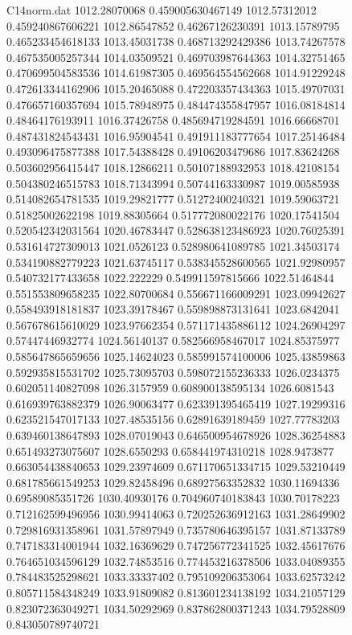 \begin{filecontents}{C14norm.dat}
1012.28070068			0.459005630467149
1012.57312012			0.459240867606221
1012.86547852			0.46267126230391
1013.15789795			0.465233454618133
1013.45031738			0.468713292429386
1013.74267578			0.467535005257344
1014.03509521			0.469703987644363
1014.32751465			0.470699504583536
1014.61987305			0.469564554562668
1014.91229248			0.472613344162906
1015.20465088			0.472203357434363
1015.49707031			0.476657160357694
1015.78948975			0.484474355847957
1016.08184814			0.48464176193911
1016.37426758			0.485694719284591
1016.66668701			0.487431824543431
1016.95904541			0.491911183777654
1017.25146484			0.493096475877388
1017.54388428			0.49106203479686
1017.83624268			0.503602956415447
1018.12866211			0.50107188932953
1018.42108154			0.504380246515783
1018.71343994			0.50744163330987
1019.00585938			0.514082654781535
1019.29821777			0.51272400240321
1019.59063721			0.51825002622198
1019.88305664			0.517772080022176
1020.17541504			0.520542342031564
1020.46783447			0.528638123486923
1020.76025391			0.531614727309013
1021.0526123			0.528980641089785
1021.34503174			0.534190882779223
1021.63745117			0.538345528600565
1021.92980957			0.540732177433658
1022.222229			0.549911597815666
1022.51464844			0.551553809658235
1022.80700684			0.556671166009291
1023.09942627			0.558493918181837
1023.39178467			0.559898873131641
1023.6842041			0.567678615610029
1023.97662354			0.571171435886112
1024.26904297			0.57447446932774
1024.56140137			0.582566958467017
1024.85375977			0.585647865659656
1025.14624023			0.585991574100006
1025.43859863			0.592935815531702
1025.73095703			0.598072155236333
1026.0234375			0.602051140827098
1026.3157959			0.608900138595134
1026.6081543			0.616939763882379
1026.90063477			0.623391395465419
1027.19299316			0.623521547017133
1027.48535156			0.62891639189459
1027.77783203			0.639460138647893
1028.07019043			0.646500954678926
1028.36254883			0.651493273075607
1028.6550293			0.658441974310218
1028.9473877			0.663054438840653
1029.23974609			0.671170651334715
1029.53210449			0.681785661549253
1029.82458496			0.68927563352832
1030.11694336			0.69589085351726
1030.40930176			0.704960740183843
1030.70178223			0.712162599496956
1030.99414063			0.720252636912163
1031.28649902			0.729816931358961
1031.57897949			0.735780646395157
1031.87133789			0.747183314001944
1032.16369629			0.747256772341525
1032.45617676			0.764651034596129
1032.74853516			0.774453216378506
1033.04089355			0.784483525298621
1033.33337402			0.795109206353064
1033.62573242			0.805711584348249
1033.91809082			0.813601234138192
1034.21057129			0.823072363049271
1034.50292969			0.837862800371243
1034.79528809			0.843050789740721

\end{filecontents}
